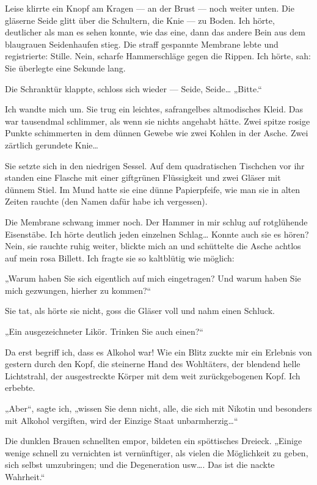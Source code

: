 Leise klirrte ein Knopf am Kragen — an der Brust — noch weiter
unten. Die gläserne Seide glitt über die Schultern, die Knie — zu
Boden. Ich hörte, deutlicher als man es sehen konnte, wie das eine,
dann das andere Bein aus dem blaugrauen Seidenhaufen stieg. Die
straff gespannte Membrane lebte und registrierte: Stille. Nein,
scharfe Hammerschläge gegen die Rippen. Ich hörte, sah: Sie
überlegte eine Sekunde lang.

Die Schranktür klappte, schloss sich wieder — Seide, Seide\ldots{}
„Bitte.“

Ich wandte mich um. Sie trug ein leichtes, safrangelbes
altmodisches Kleid. Das war tausendmal schlimmer, als wenn sie
nichts angehabt hätte. Zwei spitze rosige Punkte schimmerten in dem
dünnen Gewebe wie zwei Kohlen in der Asche. Zwei zärtlich gerundete
Knie\ldots{}

Sie setzte sich in den niedrigen Sessel. Auf dem
quadratischen Tischchen vor ihr standen eine Flasche mit einer
giftgrünen Flüssigkeit und zwei Gläser mit dünnem Stiel. Im Mund
hatte sie eine dünne Papierpfeife, wie man sie in alten Zeiten
rauchte (den Namen dafür habe ich vergessen).

Die Membrane schwang immer noch. Der Hammer in mir schlug auf
rotglühende Eisenstäbe. Ich hörte deutlich jeden einzelnen
Schlag\ldots{} Konnte auch sie es hören? Nein, sie rauchte ruhig weiter,
blickte mich an und schüttelte die Asche achtlos auf mein rosa
Billett. Ich fragte sie so kaltblütig wie möglich:

„Warum haben Sie sich eigentlich auf mich eingetragen? Und warum
haben Sie mich gezwungen, hierher zu kommen?“

Sie tat, als hörte sie nicht, goss die Gläser voll und nahm einen
Schluck.

„Ein ausgezeichneter Likör. Trinken Sie auch einen?“

Da erst
begriff ich, dass es Alkohol war! Wie ein Blitz zuckte mir ein
Erlebnis von gestern durch den Kopf, die steinerne Hand des
Wohltäters, der blendend helle Lichtstrahl, der ausgestreckte
Körper mit dem weit zurückgebogenen Kopf. Ich erbebte.

„Aber“, sagte ich, „wissen Sie denn nicht, alle, die sich mit
Nikotin und besonders mit Alkohol vergiften, wird der Einzige Staat
unbarmherzig\ldots{}“

Die dunklen Brauen schnellten empor, bildeten ein spöttisches
Dreieck. „Einige wenige schnell zu vernichten ist vernünftiger, als
vielen die Möglichkeit zu geben, sich selbst umzubringen; und die
Degeneration usw\ldots{}. Das ist die nackte Wahrheit.“

